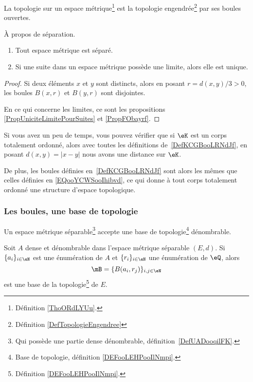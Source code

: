 \begin{proposition}     \label{PROPooZXTXooEMLgMn}
    La topologie sur un espace métrique\footnote{Définition \ref{ThoORdLYUu}.} est la topologie engendrée\footnote{Définition \ref{DefTopologieEngendree}} par ses boules ouvertes.
\end{proposition}

\begin{proposition}
    À propos de séparation.
    \begin{enumerate}
        \item
    Tout espace métrique est séparé.
\item
    Si une suite dans un espace métrique possède une limite, alors elle est unique.
    \end{enumerate}
\end{proposition}

\begin{proof}
    Si deux éléments \( x \) et \( y \) sont distincts, alors en posant \( r = d(x , y) / 3 > 0 \), les boules \( B(x,r) \) et \( B(y,r)\) sont disjointes. 

    En ce qui concerne les limites, ce sont les propositions \ref{PropUniciteLimitePourSuites} et \ref{PropFObayrf}.
\end{proof}

\begin{normaltext}
    Si vous avez un peu de temps, vous pouvez vérifier que si \( \eK\) est un corps totalement ordonné, alors avec toutes les définitions de~\ref{DefKCGBooLRNdJf}, en posant \( d(x,y)=| x-y |\) nous avons une distance sur \( \eK\).

    De plus, les boules définies en~\ref{DefKCGBooLRNdJf} sont alors les mêmes que celles définies en \eqref{EQooYCWSooIhibvd}, ce qui donne à tout corps totalement ordonné une structure d'espace topologique.
\end{normaltext}

\subsubsection{Les boules, une base de topologie}

\begin{proposition} \label{PropNBSooraAFr}
    Un espace métrique séparable\footnote{Qui possède une partie dense dénombrable, définition~\ref{DefUADooqilFK}.} accepte une base de topologie\footnote{Base de topologie, définition \ref{DEFooLEHPooIlNmpi}.} dénombrable.

     Soit \( A\) dense et dénombrable dans l'espace métrique séparable \( (E,d)\). Si \( \{ a_i \}_{i\in \eN}\) est une énumération de \( A\) et \( \{ r_i \}_{i\in \eN}\) une énumération de \( \eQ\), alors
    \begin{equation}
        \mB=\{ B(a_i,r_j) \}_{i,j\in \eN}
    \end{equation}
    est une base de la topologie\footnote{Définition \ref{DEFooLEHPooIlNmpi}.} de \( E\).
\end{proposition}

